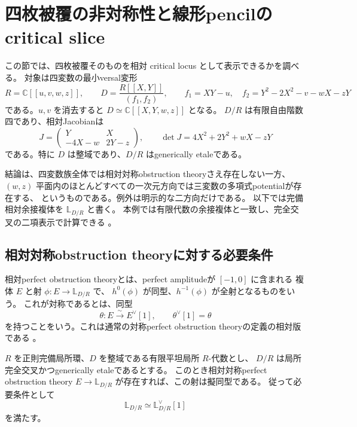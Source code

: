 \section{四枚被覆の非対称性と線形pencilの critical slice}
\label{sec:four-noncritical-v24}

この節では、四枚被覆そのものを相対 critical locus として表示できるかを調べる。
対象は四変数の最小versal変形
\begin{equation}\label{eq:four-noncritical-input-v24}
 R=\mathbb C[[u,v,w,z]],\qquad
 D=\frac{R[[X,Y]]}{(f_1,f_2)},\qquad
 f_1=XY-u,\quad f_2=Y^2-2X^2-v-wX-zY
\end{equation}
である。$u,v$ を消去すると $D\simeq\mathbb C[[X,Y,w,z]]$ となる。
$D/R$ は有限自由階数四であり、相対Jacobianは
\begin{equation}\label{eq:four-jacobian-v24}
 J=\begin{pmatrix}Y&X\\-4X-w&2Y-z\end{pmatrix},\qquad
 \det J=4X^2+2Y^2+wX-zY
\end{equation}
である。特に $D$ は整域であり、$D/R$ はgenerically etaleである。

結論は、四変数族全体では相対対称obstruction theoryさえ存在しない一方、
$(w,z)$ 平面内のほとんどすべての一次元方向では三変数の多項式potentialが存在する、
というものである。例外は明示的な二方向だけである。
以下では完備相対余接複体を $\mathbb L_{D/R}$ と書く。
本例では有限代数の余接複体と一致し、完全交叉の二項表示で計算できる
\cite[Tag 08SH]{Stacks}。

\subsection{相対対称obstruction theoryに対する必要条件}

相対perfect obstruction theoryとは、perfect amplitudeが $[-1,0]$ に含まれる
複体 $E$ と射 $\phi:E\to\mathbb L_{D/R}$ で、
$h^0(\phi)$ が同型、$h^{-1}(\phi)$ が全射となるものをいう。
これが対称であるとは、同型
\[
 \theta:E\xrightarrow{\sim}E^\vee[1],\qquad
 \theta^\vee[1]=\theta
\]
を持つことをいう。これは通常の対称perfect obstruction theoryの定義の相対版である
\cite[Definition 1.10]{BehrendFantechiSymmetric}。

\begin{lemma}\label{lem:symmetric-pot-is-cotangent-v24}
$R$ を正則完備局所環、$D$ を整域である有限平坦局所 $R$-代数とし、
$D/R$ は局所完全交叉かつgenerically etaleであるとする。
このとき相対対称perfect obstruction theory
$E\to\mathbb L_{D/R}$ が存在すれば、この射は擬同型である。
従って必要条件として
\[
 \mathbb L_{D/R}\simeq\mathbb L_{D/R}^\vee[1]
\]
を満たす。
\end{lemma}

